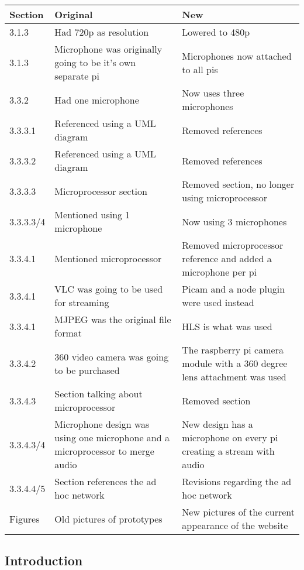 \documentclass[onecolumn, draftclsnofoot,10pt, compsoc]{IEEEtran}
\begin{document}
\begin{center}
 \begin{tabular}{||p{1cm} p{7cm} p{7cm}||} 
 \hline
 Section & Original & New\\ [.5ex] 
 \hline\hline
 3.1.3 & Had 720p as resolution & Lowered to 480p\\
 \hline
  3.1.3 & Microphone was originally going to be it's own separate pi & Microphones now attached to all pis\\
   \hline
  3.3.2 & Had one microphone & Now uses three microphones\\
  \hline
  3.3.3.1 & Referenced using a UML diagram & Removed references\\ 
  \hline
  3.3.3.2 & Referenced using a UML diagram & Removed references\\ 
  \hline
  3.3.3.3 & Microprocessor section & Removed section, no longer using microprocessor  \\
  \hline
  3.3.3.3/4 & Mentioned using 1 microphone & Now using 3 microphones \\
    \hline
 3.3.4.1 & Mentioned microprocessor & Removed microprocessor reference and added a microphone per pi \\
  \hline
 3.3.4.1 & VLC was going to be used for streaming & Picam and a node plugin were used instead \\ 
 \hline
 3.3.4.1 & MJPEG was the original file format & HLS is what was used\\ 
 \hline
 3.3.4.2 & 360 video camera was going to be purchased & The raspberry pi camera module with a 360 degree lens attachment was used\\
 \hline
 3.3.4.3 & Section talking about microprocessor & Removed section \\ 
 \hline
 3.3.4.3/4 & Microphone design was using one microphone and a microprocessor to merge audio & New design has a microphone on every pi creating a stream with audio \\ 
 \hline
 3.3.4.4/5 & Section references the ad hoc network & Revisions regarding the ad hoc network\\
 \hline
 Figures & Old pictures of prototypes & New pictures of the current appearance of the website\\[1ex] 
 \hline
\end{tabular}
\end{center}

\subsection{Introduction}
\end{document}
